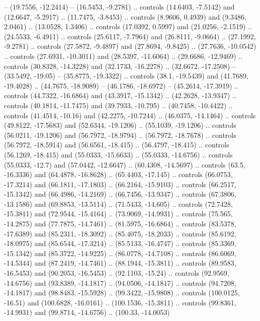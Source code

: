 {  -- (19.7556, -12.2414)
  -- (16.5453, -9.2781)
  .. controls (14.6403, -7.5142) and (12.6647, -5.2917) .. (11.7475, -3.8453)
  .. controls (8.9606, 0.4939) and (9.3486, 2.0461) .. (13.0528, 1.3406)
  .. controls (17.0392, 0.5997) and (21.0256, -2.1519) .. (24.5533, -6.4911)
  .. controls (25.6117, -7.7964) and (26.8111, -9.0664) .. (27.1992, -9.2781)
  .. controls (27.5872, -9.4897) and (27.8694, -9.8425) .. (27.7636, -10.0542)
  .. controls (27.6931, -10.3011) and (28.5397, -11.6064) .. (29.6686, -12.9469)
  .. controls (30.8328, -14.3228) and (32.1733, -16.2278) .. (32.6672, -17.2508)
  -- (33.5492, -19.05)
  -- (35.8775, -19.3322)
  .. controls (38.1, -19.5439) and (41.7689, -19.4028) .. (44.7675, -18.9089)
  -- (46.1786, -18.6972)
  -- (45.2614, -17.3919)
  .. controls (44.7322, -16.6864) and (43.3917, -15.1342) .. (42.2628, -13.9347)
  .. controls (40.1814, -11.7475) and (39.7933, -10.795) .. (40.7458, -10.4422)
  .. controls (41.4514, -10.16) and (42.2275, -10.7244) .. (46.0375, -14.1464)
  .. controls (49.8122, -17.5683) and (52.6344, -19.1206) .. (55.1039, -19.1206)
  .. controls (56.0211, -19.1206) and (56.7972, -18.9794) .. (56.7972, -18.7678)
  .. controls (56.7972, -18.5914) and (56.6561, -18.415) .. (56.4797, -18.415)
  .. controls (56.1269, -18.415) and (55.0333, -15.6633) .. (55.0333, -14.6756)
  .. controls (55.0333, -12.7) and (57.0442, -12.6647) .. (60.4308, -14.5697)
  .. controls (63.5, -16.3336) and (64.4878, -16.8628) .. (65.4403, -17.145)
  .. controls (66.0753, -17.3214) and (66.1811, -17.1803) .. (66.2164, -15.9103)
  .. controls (66.2517, -15.1342) and (66.4986, -14.2169) .. (66.7456, -13.9347)
  .. controls (67.3806, -13.1586) and (69.8853, -13.5114) .. (71.5433, -14.605)
  .. controls (72.7428, -15.3811) and (72.9544, -15.4164) .. (73.9069, -14.9931)
  .. controls (75.565, -14.2875) and (77.7875, -14.7461) .. (81.5975, -16.6864)
  .. controls (83.5378, -17.6389) and (85.2311, -18.3092) .. (85.4075, -18.2033)
  .. controls (85.6192, -18.0975) and (85.6544, -17.3214) .. (85.5133, -16.4747)
  .. controls (85.3369, -15.1342) and (85.3722, -14.9225) .. (86.0778, -14.7108)
  .. controls (86.6069, -14.5344) and (87.2419, -14.7461) .. (88.1944, -15.3811)
  .. controls (89.9583, -16.5453) and (90.2053, -16.5453) .. (92.1103, -15.24)
  .. controls (92.9569, -14.6756) and (93.8389, -14.1817) .. (94.0506, -14.1817)
  .. controls (94.7208, -14.1817) and (98.8483, -15.5928) .. (99.3422, -15.9808)
  .. controls (100.0125, -16.51) and (100.6828, -16.0161) .. (100.1536, -15.3811)
  .. controls (99.8361, -14.9931) and (99.8714, -14.6756) .. (100.33, -14.0053)
}
